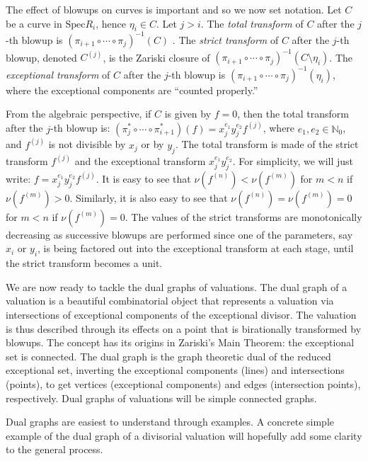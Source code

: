 \documentclass[11pt]{amsart}
\theoremstyle{definition}
\begin{document}
The effect of blowups on curves is important and so we now set notation. Let $C$ be a curve in $\text{Spec}R_i$, hence $\eta_i \in C$. Let $j>i$. The {\it total transform} of $C$ after the $j$-th blowup is $(\pi_{i+1} \circ \cdots \circ \pi_{j})^{-1}(C)$ . The {\it strict transform} of $C$ after the $j$-th blowup, denoted $C^{(j)}$, is the Zariski closure of $(\pi_{i+1} \circ \cdots \circ \pi_{j})^{-1}(C\setminus \eta_i)$. The {\it exceptional transform} of $C$ after the $j$-th blowup is $(\pi_{i+1} \circ \cdots \circ \pi_{j})^{-1}(\eta_i)$, where the exceptional components are ``counted properly.''

From the algebraic perspective, if $C$ is given by $f=0$, then the total transform after the $j$-th blowup is: $\displaystyle (\pi_j^*\circ\cdots\circ\pi_{i+1}^*)(f)=x_j^{e_1}y_j^{e_2}f^{(j)}$, where $e_1,e_2\in\mathbb{N}_0$, and $f^{(j)}$ is not divisible by $x_j$ or by $y_j$. The total transform is made of the strict transform $f^{(j)}$ and the exceptional transform $x_j^{e_1}y_j^{e_2}$. For simplicity, we will just write: $f=x_j^{e_1}y_j^{e_2}f^{(j)}$. It is easy to see that $\nu(f^{(n)})<\nu(f^{(m)})$ for $m<n$ if $\nu(f^{(m)})>0$. Similarly, it is also easy to see that $\nu(f^{(n)})=\nu(f^{(m)})=0$ for $m<n$ if $\nu(f^{(m)})=0$. The values of the strict transforms are monotonically decreasing as successive blowups are performed since one of the parameters, say $x_i$ or $y_i$, is being factored out into the exceptional transform at each stage, until the strict transform becomes a unit.

We are now ready to tackle the dual graphs of valuations. The dual graph of a valuation is a beautiful combinatorial object that represents a valuation via intersections of exceptional components of the exceptional divisor. The valuation is thus described through its effects on a point that is birationally transformed by blowups. The concept has its origins in Zariski's Main Theorem: the exceptional set is connected. The dual graph is the graph theoretic dual of the reduced exceptional set, inverting the exceptional components (lines) and intersections (points), to get vertices (exceptional components) and edges (intersection points), respectively. Dual graphs of valuations will be simple connected graphs.

Dual graphs are easiest to understand through examples. A concrete simple example of the dual graph of a divisorial valuation will hopefully add some clarity to the general process.
\end{document}

